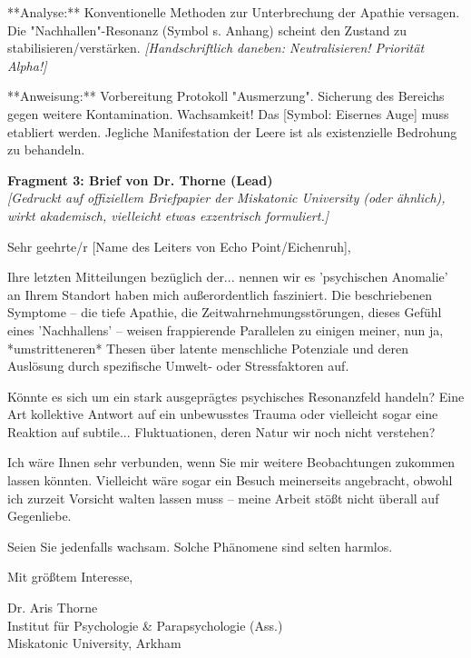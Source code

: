\documentclass[10pt, a4paper]{article}
\begin{document}
**Analyse:** Konventionelle Methoden zur Unterbrechung der Apathie versagen. Die "Nachhallen"-Resonanz (Symbol s. Anhang) scheint den Zustand zu stabilisieren/verstärken. \textit{[Handschriftlich daneben: Neutralisieren! Priorität Alpha!]}

**Anweisung:** Vorbereitung Protokoll "Ausmerzung". Sicherung des Bereichs gegen weitere Kontamination. Wachsamkeit! Das [Symbol: Eisernes Auge] muss etabliert werden. Jegliche Manifestation der Leere ist als existenzielle Bedrohung zu behandeln.

\vspace{1cm} %
\hrulefill
\vspace{1cm} %


\textbf{Fragment 3: Brief von Dr. Thorne (Lead)} \\
\textit{[Gedruckt auf offiziellem Briefpapier der Miskatonic University (oder ähnlich), wirkt akademisch, vielleicht etwas exzentrisch formuliert.]}

{\selectfont %
Sehr geehrte/r [Name des Leiters von Echo Point/Eichenruh],

Ihre letzten Mitteilungen bezüglich der... nennen wir es 'psychischen Anomalie' an Ihrem Standort haben mich außerordentlich fasziniert. Die beschriebenen Symptome – die tiefe Apathie, die Zeitwahrnehmungsstörungen, dieses Gefühl eines 'Nachhallens' – weisen frappierende Parallelen zu einigen meiner, nun ja, *umstritteneren* Thesen über latente menschliche Potenziale und deren Auslösung durch spezifische Umwelt- oder Stressfaktoren auf.

Könnte es sich um ein stark ausgeprägtes psychisches Resonanzfeld handeln? Eine Art kollektive Antwort auf ein unbewusstes Trauma oder vielleicht sogar eine Reaktion auf subtile... Fluktuationen, deren Natur wir noch nicht verstehen?

Ich wäre Ihnen sehr verbunden, wenn Sie mir weitere Beobachtungen zukommen lassen könnten. Vielleicht wäre sogar ein Besuch meinerseits angebracht, obwohl ich zurzeit Vorsicht walten lassen muss – meine Arbeit stößt nicht überall auf Gegenliebe.

Seien Sie jedenfalls wachsam. Solche Phänomene sind selten harmlos.

Mit größtem Interesse,

Dr. Aris Thorne \\
Institut für Psychologie \& Parapsychologie (Ass.) \\
Miskatonic University, Arkham
\par} %
\end{document}
